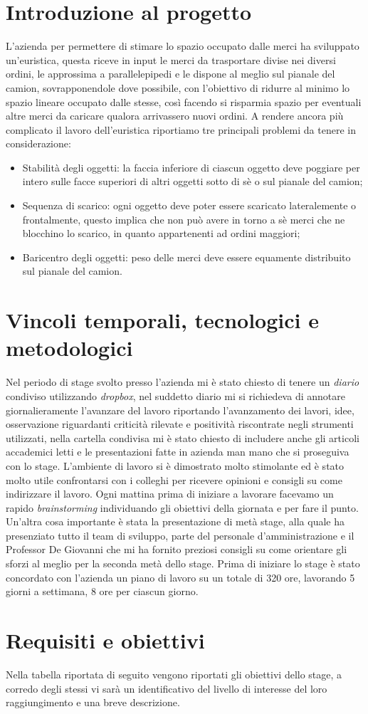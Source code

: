 \section{Introduzione al progetto}
L'azienda per permettere di stimare lo spazio occupato dalle merci ha sviluppato un'euristica, questa riceve in input le merci da trasportare divise nei diversi ordini, le approssima a parallelepipedi e le dispone al meglio sul pianale del camion, sovrapponendole dove possibile, con l'obiettivo di ridurre al minimo lo spazio lineare occupato dalle stesse, così facendo si risparmia spazio per eventuali altre merci da caricare qualora arrivassero nuovi ordini.
A rendere ancora più complicato il lavoro dell'euristica riportiamo tre principali problemi da tenere in considerazione:
\begin{itemize}
    \item Stabilità degli oggetti: la faccia inferiore di ciascun oggetto deve poggiare per intero sulle facce superiori di altri oggetti sotto di sè o sul pianale del camion;
    \item Sequenza di scarico: ogni oggetto deve poter essere scaricato lateralemente o frontalmente, questo implica che non può avere in torno a sè merci che ne blocchino lo scarico, in quanto appartenenti ad ordini maggiori;
    \item Baricentro degli oggetti: peso delle merci deve essere equamente distribuito sul pianale del camion.
\end{itemize}

\section{Vincoli temporali, tecnologici e metodologici}
Nel periodo di stage svolto presso l'azienda mi è stato chiesto di tenere un \textit{diario} condiviso utilizzando \textit{dropbox}, nel suddetto diario mi si richiedeva di annotare giornalieramente l'avanzare del lavoro riportando l'avanzamento dei lavori, idee, osservazione riguardanti criticità rilevate e positività riscontrate negli strumenti utilizzati, nella cartella condivisa mi è stato chiesto di includere anche gli articoli accademici letti e le presentazioni fatte in azienda man mano che si proseguiva con lo stage. L'ambiente di lavoro si è dimostrato molto stimolante ed è stato molto utile confrontarsi con i colleghi per ricevere opinioni e consigli su come indirizzare il lavoro. Ogni mattina prima di iniziare a lavorare facevamo un rapido \textit{brainstorming} individuando gli obiettivi della giornata e per fare il punto.
Un'altra cosa importante è stata la presentazione di metà stage, alla quale ha presenziato tutto il team di sviluppo, parte del personale d'amministrazione e il Professor De Giovanni che mi ha fornito preziosi consigli su come orientare gli sforzi al meglio per la seconda metà dello stage.
Prima di iniziare lo stage è stato concordato con l'azienda un piano di lavoro su un totale di 320 ore, lavorando 5 giorni a settimana, 8 ore per ciascun giorno. 

\section{Requisiti e obiettivi}
Nella tabella riportata di seguito vengono riportati gli obiettivi dello stage, a corredo degli stessi vi sarà un identificativo del livello di interesse del loro raggiungimento e una breve descrizione.
